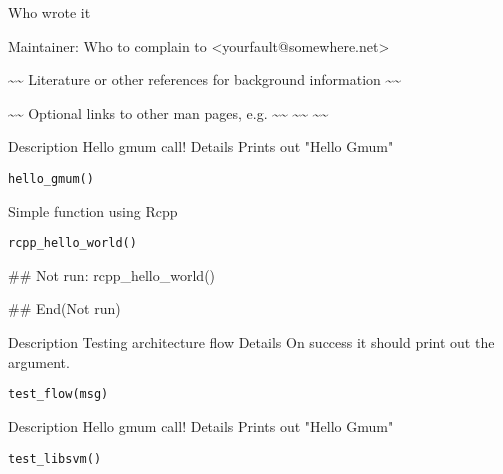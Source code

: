 \documentclass[letterpaper]{book}
\begin{document}
%
\begin{Author}\relax
Who wrote it

Maintainer: Who to complain to <yourfault@somewhere.net>
\end{Author}
%
\begin{References}\relax
\textasciitilde{}\textasciitilde{} Literature or other references for background information \textasciitilde{}\textasciitilde{}
\end{References}
%
\begin{SeeAlso}\relax
\textasciitilde{}\textasciitilde{} Optional links to other man pages, e.g. \textasciitilde{}\textasciitilde{}
\textasciitilde{}\textasciitilde{}  \textasciitilde{}\textasciitilde{}
\end{SeeAlso}
%
\begin{Description}\relax
Description Hello gmum call! Details Prints out "Hello
Gmum"
\end{Description}
%
\begin{Usage}
\begin{verbatim}
hello_gmum()
\end{verbatim}
\end{Usage}
%
\begin{Description}\relax
Simple function using Rcpp
\end{Description}
%
\begin{Usage}
\begin{verbatim}
rcpp_hello_world()	
\end{verbatim}
\end{Usage}
%
\begin{Examples}
\begin{ExampleCode}
## Not run: 
rcpp_hello_world()

## End(Not run)
\end{ExampleCode}
\end{Examples}
%
\begin{Description}\relax
Description Testing architecture flow Details On success it
should print out the argument.
\end{Description}
%
\begin{Usage}
\begin{verbatim}
test_flow(msg)
\end{verbatim}
\end{Usage}
%
\begin{Description}\relax
Description Hello gmum call! Details Prints out "Hello
Gmum"
\end{Description}
%
\begin{Usage}
\begin{verbatim}
test_libsvm()
\end{verbatim}
\end{Usage}
\printindex{}
\end{document}
